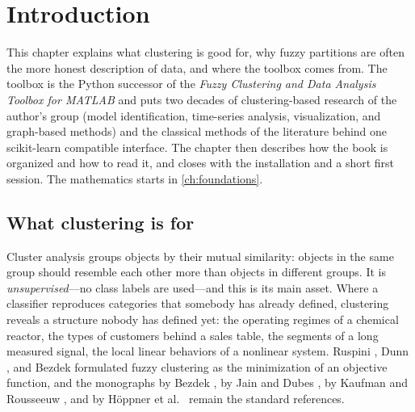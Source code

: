 \chapter{Introduction}\label{ch:introduction}
\begin{roadmap}
This chapter explains what clustering is good for, why fuzzy partitions are often the more honest description of data, and where the  toolbox comes from. The toolbox is the Python successor of the \emph{Fuzzy Clustering and Data Analysis Toolbox for MATLAB} and puts two decades of clustering-based research of the author's group (model identification, time-series analysis, visualization, and graph-based methods) and the classical methods of the literature behind one scikit-learn compatible interface. The chapter then describes how the book is organized and how to read it, and closes with the installation and a short first session. The mathematics starts in \cref{ch:foundations}.
\end{roadmap}

\section{What clustering is for}\label{sec:intro:purpose}

Cluster analysis groups objects by their mutual similarity: objects in the same group should resemble each other more than objects in different groups. It is \emph{unsupervised}---no class labels are used---and this is its main asset. Where a classifier reproduces categories that somebody has already defined, clustering reveals a structure nobody has defined yet: the operating regimes of a chemical reactor, the types of customers behind a sales table, the segments of a long measured signal, the local linear behaviors of a nonlinear system. Ruspini \cite{ruspini:1969}, Dunn \cite{dunn:1973:fcm}, and Bezdek \cite{bezdek:1981} formulated fuzzy clustering as the minimization of an objective function, and the monographs by Bezdek \cite{bezdek:1981}, by Jain and Dubes \cite{jain:1988:book}, by Kaufman and Rousseeuw \cite{kaufman:1990:groups}, and by H\"oppner et al.\ \cite{hoppner:1999:book} remain the standard references.

